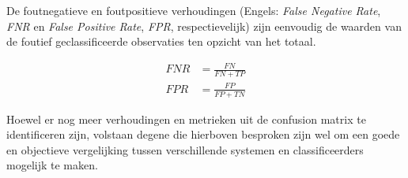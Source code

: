 De foutnegatieve en foutpositieve verhoudingen (Engels: \textit{False Negative Rate}, \textit{FNR} en \textit{False Positive Rate}, \textit{FPR}, respectievelijk) zijn eenvoudig de waarden van de foutief geclassificeerde observaties ten opzicht van het totaal. 

\[
\begin{aligned}
FNR &= \frac{FN}{FN+TP}\\
FPR &= \frac{FP}{FP+TN}
\end{aligned}
\]

Hoewel er nog meer verhoudingen en metrieken uit de confusion matrix te identificeren zijn, volstaan degene die hierboven besproken zijn wel om een goede en objectieve vergelijking tussen verschillende systemen en classificeerders mogelijk te maken.

